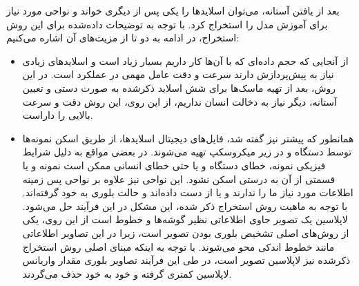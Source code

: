 بعد از یافتن آستانه، می‌توان اسلاید‌ها را یکی پس از دیگری خواند و نواحی مورد نیاز برای آموزش مدل را استخراج کرد.
با توجه به توضیحات داده‌شده برای این روش استخراج، در ادامه به دو تا از مزیت‌های آن اشاره می‌کنیم:
\begin{itemize}
    \item از آنجایی که حجم داده‌ای که با آن‌ها کار داریم بسیار زیاد است و اسلاید‌های زیادی نیاز به پیش‌پردازش دارند سرعت و دقت عامل مهمی در عملکرد است.
    در این روش، بعد از تهیه ماسک‌ها برای شش اسلاید ذکر‌شده به صورت دستی و تعیین آستانه، دیگر نیاز به دخالت انسان نداریم، از این روی، این روش دقت و سرعت بالایی را داراست.
    \item همانطور که پیشتر نیز گفته شد، فایل‌های دیجیتال اسلاید‌ها، از طریق اسکن نمونه‌ها توسط دستگاه و در زیر میکروسکپ تهیه می‌شوند.
    در بعضی مواقع به دلیل شرایط فیزیکی نمونه، خطای دستگاه و یا حتی خطای انسانی ممکن است نمونه و یا قسمتی از آن به درستی اسکن نشود.
    این نواحی نیز علاوه بر نواحی پس زمینه اطلاعات مورد نیاز ما را ندارند و یا از دست داده‌اند و حالت بلوری به خود گرفته‌اند.
    با توجه به ماهیت روش استخراج ذکر شده، این مشکل در این فرآیند حل می‌شود.
    لاپلاسین یک تصویر حاوی اطلاعاتی نظیر گوشه‌ها و خطوط است از این روی، یکی از روش‌های اصلی تشخیص بلوری بودن تصویر است، زیرا در این تصاویر اطلاعاتی مانند خطوط اندکی محو می‌شوند.
    با توجه به اینکه مبنای اصلی روش استخراج ذکر‌شده نیز لاپلاسین تصویر است، در طی این فرآیند تصاویر بلوری مقدار واریانس لاپلاسین کمتری گرفته و خود به خود حذف می‌گردند.
\end{itemize}
